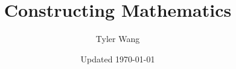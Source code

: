 \documentclass[10pt, openany, english]{extbook}
\title{Constructing Mathematics}
\date{\small Updated \today}
\author{Tyler Wang}
\begin{document}
\maketitle


\edef\mychapter{Contents}
\tableofcontents











\end{document}
